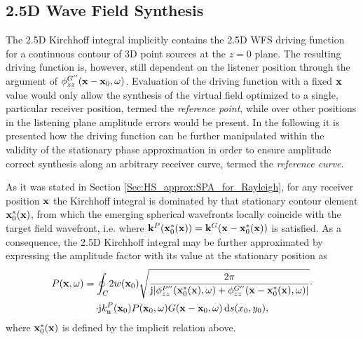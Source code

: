 \subsection{2.5D Wave Field Synthesis}

The 2.5D Kirchhoff integral implicitly contains the 2.5D WFS driving function for a continuous contour of 3D point sources at the $z = 0$ plane.
The resulting driving function is, however, still dependent on the listener position through the argument of $\phi^{G''}_{zz}(\mathbf{x}-\mathbf{x}_0,\omega)$. 
Evaluation of the driving function with a fixed $\mathbf{x}$ value would only allow the synthesis of the virtual field optimized to a single, particular receiver position, termed the \emph{reference point}, while over other positions in the listening plane amplitude errors would be present.
In the following it is presented how the driving function can be further manipulated within the validity of the stationary phase approximation in order to ensure amplitude correct synthesis along an arbitrary receiver curve, termed the \emph{reference curve}.  

As it was stated in Section \ref{Sec:HS_approx:SPA_for_Rayleigh}, for any receiver position $\mathbf{x}$ the Kirchhoff integral is dominated by that stationary contour element $\mathbf{x}_0^*(\mathbf{x})$, from which the emerging spherical wavefronts locally coincide with the target field wavefront, i.e. where $\mathbf{k}^P(\mathbf{x}_0^*(\mathbf{x})) = \mathbf{k}^G(\mathbf{x} - \mathbf{x}_0^*(\mathbf{x}))$ is satisfied.
As a consequence, the 2.5D Kirchhoff integral may be further approximated by expressing the amplitude factor with its value at the stationary position as
\begin{multline}
P(\mathbf{x},\omega) = 
\oint_{C}
\! 2 w(\mathbf{x}_0) 
\sqrt{\frac{2 \pi}{\mathrm{j} |\phi^{P''}_{zz}(\mathbf{x}_0^*(\mathbf{x}),\omega) +\phi^{G''}_{zz}(\mathbf{x}-\mathbf{x}_0^*(\mathbf{x}),\omega)|}}
\cdot \\ \cdot
\mathrm{j} k_{\mathrm{n}}^P(\mathbf{x}_0) 	P(\mathbf{x}_0,\omega)
G(\mathbf{x}-\mathbf{x}_0,\omega) \, \mathrm{d} s(x_0,y_0),
\label{Eq:SFS_theory:25D_KI_appr}
\end{multline}
where $\mathbf{x}_0^*(\mathbf{x})$ is defined by the implicit relation above.


